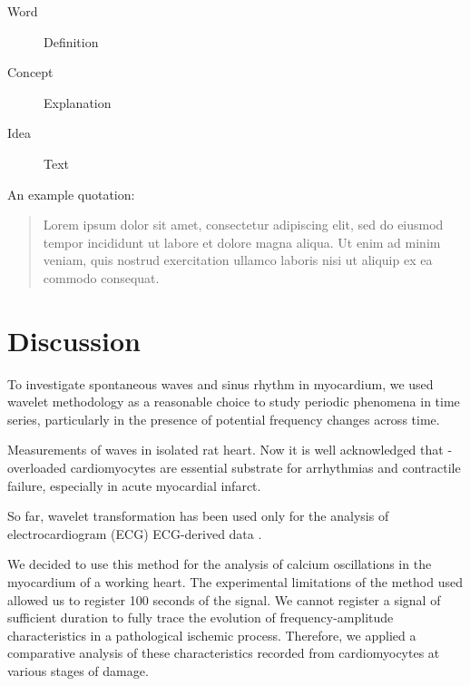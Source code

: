\documentclass{biophys-new}
\begin{document}


\begin{description}
\item[Word] Definition
\item[Concept] Explanation
\item[Idea] Text
\end{description}

An example quotation:

\begin{quote}
Lorem ipsum dolor sit amet, consectetur adipiscing elit, sed do eiusmod tempor incididunt ut labore et dolore magna aliqua. Ut enim ad minim veniam, quis nostrud exercitation ullamco laboris nisi ut aliquip ex ea commodo consequat.
\end{quote}


\section*{Discussion}

To investigate spontaneous  waves and sinus rhythm in myocardium, we
used wavelet methodology as a reasonable choice to study periodic phenomena in time series, particularly in the presence of potential frequency changes across time.

Measurements of  waves in isolated rat heart.
Now it is well acknowledged that  - overloaded cardiomyocytes are essential substrate for arrhythmias and contractile failure, especially in acute myocardial infarct.

So far, wavelet transformation has been used only for the analysis of electrocardiogram (ECG) ECG-derived data \cite{sharma2017use}.

We decided to use this method for the analysis of calcium oscillations in the myocardium of a working heart.
The experimental limitations of the method used allowed us to register 100 seconds of the signal.
We cannot register a signal of sufficient duration to fully trace the evolution of frequency-amplitude characteristics in a pathological ischemic process.
Therefore, we applied a comparative analysis of these characteristics recorded from cardiomyocytes at various stages of damage.
\end{document}
